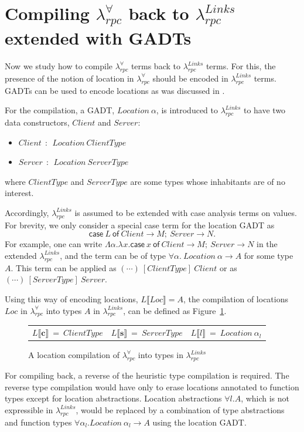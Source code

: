 \documentclass[a4paper]{article}
\theoremstyle{plain}
\theoremstyle{definition}
\newcommand{\polyrpc}{$\lambda_{rpc}^{\forall}$\xspace}
\newcommand{\linksrpc}{$\lambda_{rpc}^{Links}$\xspace}
\newcommand{\client}{\textbf{c}}
\newcommand{\server}{\textbf{s}}
\newcommand{\lamL}[3]{\lambda^{#1}#2.#3}
\newcommand{\textsfCase}{\textsf{case}}
\newcommand{\textsfOf}{\textsf{of}}
\newcommand{\case}[2]{\textsfCase ~ #1 ~\textsfOf ~ #2}
\newcommand{\loctycomp}[1]{L\llbracket#1\rrbracket}
\newcommand{\Loc}{Loc}
\begin{document}
\section{Compiling {\polyrpc} back to {\linksrpc} extended with GADTs}
\label{sec:compilationwithgadts}


%
Now we study how to compile \polyrpc terms back to \linksrpc terms.
%
For this, the presence of the notion of location in \polyrpc should be
encoded in \linksrpc terms.
%
GADTs can be used to encode locations as was discussed in
\cite{CHOI:scp2020}.

%
For the compilation, a GADT, $Location \ \alpha$, is introduced to
\linksrpc to have two data constructors, $Client $ and $Server$:
\begin{itemize}
  \item $Client \ \ : \ \ Location \ ClientType$
  \item $Server \ \ : \ \ Location \ ServerType$
\end{itemize}
where $ClientType$ and $ServerType$ are some types whose
inhabitants are of no interest.

Accordingly, \linksrpc is assumed to be extended with case analysis
terms on values. For brevity, we only consider a special case term for
the location GADT as
\[
\case{L}{Client \rightarrow M; \ Server \rightarrow N}.
\]
%
For example, one can write $\Lambda\alpha.\lamL{}{x}{\case{x}{Client
    \rightarrow M; \ Server \rightarrow N}}$ in the
extended \linksrpc, and the term can be of type
$\forall\alpha. \ Location \ \alpha \rightarrow A$ for some type $A$.
%
This term can be applied as $(\cdots) \ [ClientType] \ Client$ or as
$(\cdots) \ [ServerType] \ Server$.

%
Using this way of encoding locations, $\loctycomp{\Loc}=A$, the
compilation of locations $\Loc$ in \polyrpc into types $A$ in
\linksrpc, can be defined as Figure~\ref{fig:locationcompilationback}.

\begin{figure}[h]
\centering
\begin{tabular}{l l l }
$\loctycomp{\client} \ = \ ClientType$ &
$\loctycomp{\server} \ = \ ServerType$ &
$\loctycomp{l} \ = \ Location \ \alpha_l$
\\
\end{tabular}
\caption{A location compilation of \polyrpc into types in \linksrpc}
\label{fig:locationcompilationback}
\end{figure}


%
For compiling back, a reverse of the heuristic type compilation is
required.
%
The reverse type compilation would have only to erase locations
annotated to function types except for location abstractions.
%
Location abstractions $\forall l. A$, which is not expressible in
\linksrpc, would be replaced by a combination of type abstractions and
function types $\forall\alpha_l. Location \ \alpha_l \rightarrow A$
using the location GADT.
%
\end{document}
